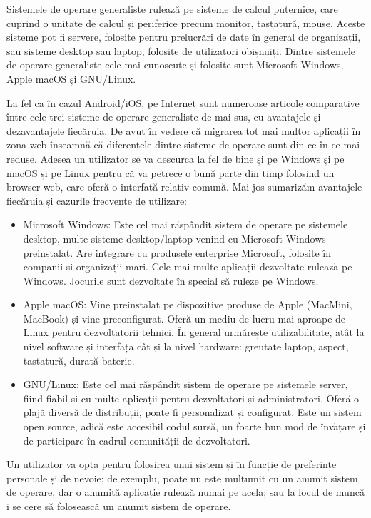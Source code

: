 Sistemele de operare generaliste rulează pe sisteme de calcul puternice, care cuprind o unitate de calcul și periferice precum monitor, tastatură, mouse.
Aceste sisteme pot fi servere, folosite pentru prelucrări de date în general de organizații, sau sisteme desktop sau laptop, folosite de utilizatori obișnuiți.
Dintre sistemele de operare generaliste cele mai cunoscute și folosite sunt Microsoft Windows, Apple macOS și GNU/Linux.

La fel ca în cazul Android/iOS, pe Internet sunt numeroase articole comparative între cele trei sisteme de operare generaliste de mai sus, cu avantajele și dezavantajele fiecăruia.
De avut în vedere că migrarea tot mai multor aplicații în zona web înseamnă că diferențele dintre sisteme de operare sunt din ce în ce mai reduse.
Adesea un utilizator se va descurca la fel de bine și pe Windows și pe macOS și pe Linux pentru că va petrece o bună parte din timp folosind un browser web, care oferă o interfață relativ comună.
Mai jos sumarizăm avantajele fiecăruia și cazurile frecvente de utilizare:

\begin{itemize}
  \item Microsoft Windows: Este cel mai răspândit sistem de operare pe sistemele desktop, multe sisteme desktop/laptop venind cu Microsoft Windows preinstalat.
    Are integrare cu produsele enterprise Microsoft, folosite în companii și organizații mari.
    Cele mai multe aplicații dezvoltate rulează pe Windows.
    Jocurile sunt dezvoltate în special să ruleze pe Windows.
  \item Apple macOS: Vine preinstalat pe dispozitive produse de Apple (MacMini, MacBook) și vine preconfigurat.
    Oferă un mediu de lucru mai aproape de Linux pentru dezvoltatorii tehnici.
    În general urmărește utilizabilitate, atât la nivel software și interfața cât și la nivel hardware: greutate laptop, aspect, tastatură, durată baterie.
  \item GNU/Linux: Este cel mai răspândit sistem de operare pe sistemele server, fiind fiabil și cu multe aplicații pentru dezvoltatori și administratori.
    Oferă o plajă diversă de distribuții, poate fi personalizat și configurat.
    Este un sistem open source, adică este accesibil codul sursă, un foarte bun mod de învățare și de participare în cadrul comunității de dezvoltatori.
\end{itemize}

Un utilizator va opta pentru folosirea unui sistem și în funcție de preferințe personale și de nevoie;
de exemplu, poate nu este mulțumit cu un anumit sistem de operare, dar o anumită aplicație rulează numai pe acela;
sau la locul de muncă i se cere să folosească un anumit sistem de operare.

